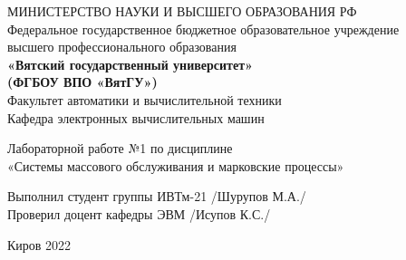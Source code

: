 \thispagestyle{empty}
\begin{center}
    МИНИСТЕРСТВО НАУКИ И ВЫСШЕГО ОБРАЗОВАНИЯ РФ\\
    Федеральное государственное бюджетное образовательное учреждение\\
    высшего профессионального образования\\
    {\bf«Вятский государственный университет»}\\
    {\bf(ФГБОУ ВПО «ВятГУ»)}\\
    Факультет автоматики и вычислительной техники\\
    Кафедра электронных вычислительных машин
\end{center}
\vfill %
\begin{center}
	Лабораторной работе №1 по дисциплине \\
    «Системы массового обслуживания и марковские процессы»
\end{center}

\vfill
\begin{flushleft}
    Выполнил студент группы ИВТм-21 \hrulefill /Шурупов М.А./\\
    Проверил доцент кафедры ЭВМ \hrulefill  /Исупов К.С./
\end{flushleft}
\vfill %

\begin{center}
    Киров 2022
\end{center}
\newpage
